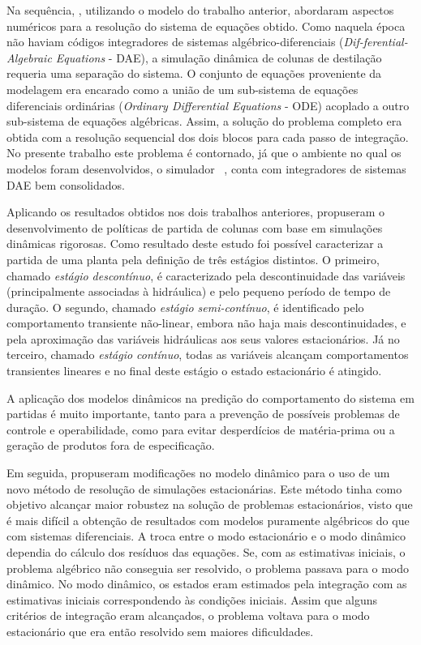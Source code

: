Na sequência, , utilizando o modelo do trabalho anterior, abordaram aspectos numéricos
para a resolução do sistema de equações obtido.
Como naquela época não haviam códigos integradores de sistemas
algébrico-diferenciais (\emph{Dif-ferential-Algebraic Equations} - DAE), a simulação dinâmica de colunas de destilação requeria uma separação do sistema.
O conjunto de equações proveniente da modelagem era encarado como a união de um sub-sistema de equações
diferenciais ordinárias (\emph{Ordinary Differential Equations} - ODE) acoplado a outro sub-sistema de equações
algébricas. Assim, a solução do problema completo era obtida com a resolução sequencial dos dois blocos para cada
passo de integração.
No presente trabalho este problema é contornado, já
que o ambiente no qual os modelos foram desenvolvidos, o simulador \emso\
\cite{Soares:2003}, conta com integradores de sistemas DAE bem consolidados.

Aplicando os resultados obtidos nos dois trabalhos anteriores,  propuseram o desenvolvimento
de políticas de partida de colunas com base em simulações dinâmicas rigorosas.
Como resultado deste estudo foi possível caracterizar a partida de uma planta pela definição de três estágios distintos.
O primeiro, chamado \emph{estágio descontínuo}, é caracterizado pela descontinuidade das variáveis
(principalmente associadas à hidráulica) e pelo pequeno período de tempo de duração.
O segundo, chamado \emph{estágio semi-contínuo}, é identificado pelo comportamento transiente não-linear, embora não
haja mais descontinuidades, e pela aproximação das variáveis hidráulicas aos seus valores estacionários.
Já no terceiro, chamado \emph{estágio contínuo}, todas as variáveis alcançam comportamentos transientes lineares e
no final deste estágio o estado estacionário é atingido.

A aplicação dos modelos dinâmicos na predição do comportamento do sistema em partidas é muito importante, tanto para
a prevenção de possíveis problemas de controle e operabilidade, como para evitar desperdícios de matéria-prima ou
a geração de produtos fora de especificação.

Em seguida,  propuseram modificações no modelo dinâmico para o uso de um novo método
de resolução de simulações estacionárias. Este método tinha como objetivo alcançar maior robustez na solução de
problemas estacionários, visto que é mais difícil a obtenção de resultados com modelos puramente algébricos do
que com sistemas diferenciais. A troca entre o modo estacionário e o modo dinâmico dependia do cálculo dos resíduos
das equações. Se, com as estimativas iniciais, o problema algébrico não conseguia ser resolvido, o problema passava
para o modo dinâmico. No modo dinâmico, os estados eram estimados pela integração com as estimativas iniciais
correspondendo às condições iniciais. Assim que alguns critérios de integração eram alcançados, o problema voltava
para o modo estacionário que era então resolvido sem maiores dificuldades.


